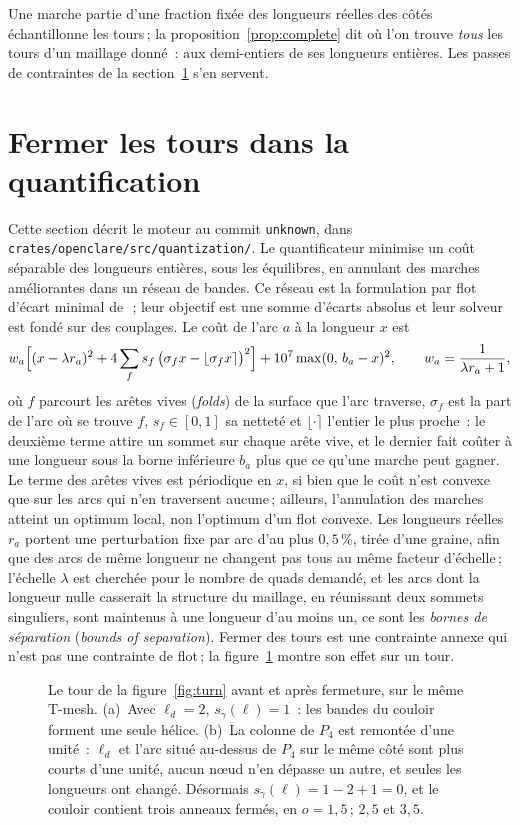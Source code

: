 \documentclass[11pt,a4paper]{article}
\newcommand{\shift}{s}
\providecommand{\enginecommit}{unknown}
\begin{document}
Une marche partie d'une fraction fixée des longueurs réelles des côtés
échantillonne les tours\,; la proposition~\ref{prop:complete} dit où l'on
trouve \emph{tous} les tours d'un maillage donné~: aux demi-entiers de ses
longueurs entières. Les passes de contraintes de la
section~\ref{sec:closing} s'en servent.

\section{Fermer les tours dans la quantification}\label{sec:closing}

Cette section décrit le moteur au commit \texttt{\enginecommit}, dans
\nolinkurl{crates/openclare/src/quantization/}. Le quantificateur minimise un
coût séparable des longueurs entières, sous les équilibres, en annulant des
marches améliorantes dans un réseau de bandes. Ce réseau est la formulation
par flot d'écart minimal de~\cite{heistermann2023bimdf}\,; leur objectif est
une somme d'écarts absolus et leur solveur est fondé sur des couplages. Le
coût de l'arc $a$ à la longueur $x$ est
\[
  w_a \Bigl[(x - \lambda r_a)^2 + 4 \sum_f s_f\, \bigl(\sigma_f x - \lfloor
  \sigma_f x \rceil\bigr)^2\Bigr] + 10^7 \max(0,\, b_a - x)^2,
  \qquad w_a = \frac{1}{\lambda r_a + 1},
\]
où $f$ parcourt les arêtes vives (\emph{folds}) de la surface que l'arc
traverse, $\sigma_f$ est la part de l'arc où se trouve $f$, $s_f \in [0, 1]$
sa netteté et $\lfloor \cdot \rceil$ l'entier le plus proche~: le deuxième
terme attire un sommet sur chaque arête vive, et le dernier fait coûter à une
longueur sous la borne inférieure $b_a$ plus que ce qu'une marche peut
gagner. Le terme des arêtes vives est périodique en $x$, si bien que le coût
n'est convexe que sur les arcs qui n'en traversent aucune\,; ailleurs,
l'annulation des marches atteint un optimum local, non l'optimum d'un flot
convexe. Les longueurs réelles $r_a$
portent une perturbation fixe par arc d'au plus $0,5\,\%$, tirée d'une
graine, afin que des arcs
de même longueur ne changent pas tous au même facteur d'échelle\,; l'échelle
$\lambda$ est cherchée pour le nombre de quads demandé, et les arcs dont la
longueur nulle casserait la structure du maillage, en réunissant deux
sommets singuliers, sont maintenus à une longueur d'au moins un, ce sont les
\emph{bornes de séparation} (\emph{bounds of separation}). Fermer des tours
est une contrainte annexe qui n'est pas une contrainte de flot\,; la
figure~\ref{fig:closing} montre son effet sur un tour.

\begin{figure}[t]
\centering

\caption{Le tour de la figure~\ref{fig:turn} avant et après fermeture, sur
le même T-mesh. (a)~Avec $\ell_d = 2$, $\shift_\gamma(\ell) = 1$~: les bandes
du couloir forment une seule hélice. (b)~La colonne de $P_4$ est remontée
d'une unité~: $\ell_d$ et l'arc situé au-dessus de $P_4$ sur le même côté
sont plus courts d'une unité, aucun nœud n'en dépasse un autre, et seules
les longueurs ont changé. Désormais $\shift_\gamma(\ell) = 1 - 2 + 1 = 0$, et
le couloir contient trois anneaux fermés, en $o = 1,5$\,; $2,5$ et $3,5$.}
\label{fig:closing}
\end{figure}
\end{document}
